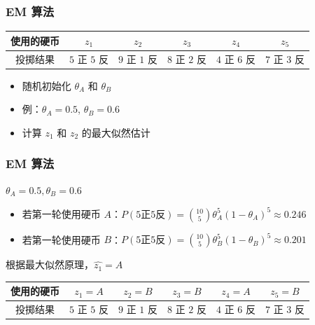 \documentclass{beamer}
\newcommand{\Gh}{\theta}
\begin{document}
\begin{frame}
    \frametitle{EM 算法}

    \begin{table}
        \begin{tabular}{c|c|c|c|c|c}
            使用的硬币 & $z_1$ & $z_2$ & $z_3$ & $z_4$ & $z_5$ \\\hline
            投掷结果 & $5$ 正 $5$ 反 & $9$ 正 $1$ 反 & $8$ 正 $2$ 反 & $4$ 正 $6$ 反 & $7$ 正 $3$ 反
        \end{tabular}
    \end{table}

    \begin{itemize}
        \item 随机初始化 $\Gh_A$ 和 $\Gh_B$
        \item 例：$\Gh_A = 0.5$, $\Gh_B = 0.6$
        \item 计算 $z_1$ 和 $z_2$ 的最大似然估计
    \end{itemize}

\end{frame}

\begin{frame}
    \frametitle{EM 算法}

    $\Gh_A = 0.5, \Gh_B = 0.6$

    \begin{itemize}
        \item 若第一轮使用硬币 $A$：$P(5 \text{正} 5 \text{反}) = {10 \choose 5}\Gh_A^{5}(1 - \Gh_A)^{5} \approx 0.246$
        \item 若第一轮使用硬币 $B$：$P(5 \text{正} 5 \text{反}) = {10 \choose 5}\Gh_B^{5}(1 - \Gh_B)^{5} \approx 0.201$
    \end{itemize}

    根据最大似然原理，$\hat{z_1} = A$

    \begin{table}
        \begin{tabular}{c|c|c|c|c|c}
            使用的硬币 & $z_1 = A$ & $z_2 = B$ & $z_3 = B$ & $z_4 = A$ & $z_5 = B$ \\\hline
            投掷结果 & $5$ 正 $5$ 反 & $9$ 正 $1$ 反 & $8$ 正 $2$ 反 & $4$ 正 $6$ 反 & $7$ 正 $3$ 反
        \end{tabular}
    \end{table}

\end{frame}
\end{document}
